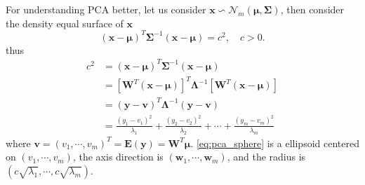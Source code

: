 For understanding PCA better, let us consider $\mathbf{x} \backsim \mathcal{N}_m(\mathbf{\mu,\Sigma})$, then consider the density equal surface of $\mathbf{x}$
\begin{equation}
	\label{eq:pca_sphere}
	(\mathbf{x}-\mathbf{\mu})^T\mathbf{\Sigma}^{-1}(\mathbf{x}-\mathbf{\mu}) = c^2, \quad c>0.
\end{equation}
thus
\begin{align*}
	c^2 &= (\mathbf{x}-\mathbf{\mu})^T\mathbf{\Sigma}^{-1}(\mathbf{x}-\mathbf{\mu})\\
	&= [\mathbf{W}^T(\mathbf{x}-\mathbf{\mu})]^T\mathbf{\Lambda}^{-1}[\mathbf{W}^T(\mathbf{x}-\mathbf{\mu})]\\
	&= (\mathbf{y}-\mathbf{v})^T\mathbf{\Lambda}^{-1}(\mathbf{y}-\mathbf{v})\\
	&= \frac{(y_1-v_1)^2}{\lambda_1}+\frac{(y_2-v_2)^2}{\lambda_2}+\cdots+\frac{(y_m-v_m)^2}{\lambda_m}
\end{align*}
where $\mathbf{v} = (v_1,\cdots,v_m)^T = \mathbf{E}(\mathbf{y}) = \mathbf{W}^T\mathbf{\mu}$. \ref{eq:pca_sphere} is a ellipsoid centered on $(v_1,\cdots,v_m)$, the axis direction is $(\mathbf{w}_1,\cdots,\mathbf{w}_m)$, and the radius is $(c\sqrt{\lambda_1},\cdots,c\sqrt{\lambda_m})$.


